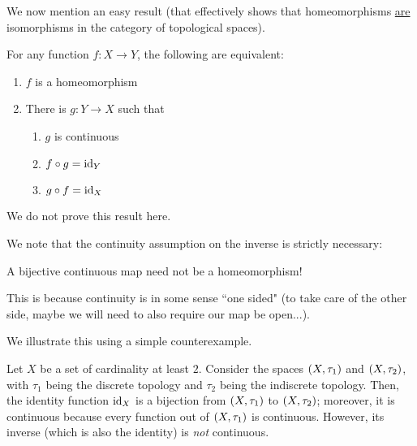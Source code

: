 We now mention an easy result (that effectively shows that homeomorphisms \underline{are} isomorphisms in the category of topological spaces).

\begin{boxlemma} %
    For any function $f : X \to Y$, the following are equivalent:
    \begin{enumerate}
        \item $f$ is a homeomorphism
        \item There is $g : Y \to X$ such that
        \begin{enumerate}
            \item $g$ is continuous
            \item $f \circ g = \operatorname{id}_Y$
            \item $g \circ f = \operatorname{id}_X$
        \end{enumerate}
    \end{enumerate}
\end{boxlemma}

We do not prove this result here.

We note that the continuity assumption on the inverse is strictly necessary:
\begin{boxwarning}
    A bijective continuous map need not be a homeomorphism! 
\end{boxwarning}
This is because continuity is in some sense ``one sided" (to take care of the other side, maybe we will need to also require our map be open...).

We illustrate this using a simple counterexample.

\begin{boxcexample}
    Let $X$ be a set of cardinality at least $2$. Consider the spaces $\left( X, \tau_1 \right)$ and $\left( X, \tau_2 \right)$, with $\tau_1$ being the discrete topology and $\tau_2$ being the indiscrete topology. Then, the identity function $\operatorname{id}_X$ is a bijection from $\left( X, \tau_1 \right)$ to $\left( X, \tau_2 \right)$; moreover, it is continuous because every function out of $\left( X, \tau_1 \right)$ is continuous. However, its inverse (which is also the identity) is \textit{not} continuous.
\end{boxcexample}
